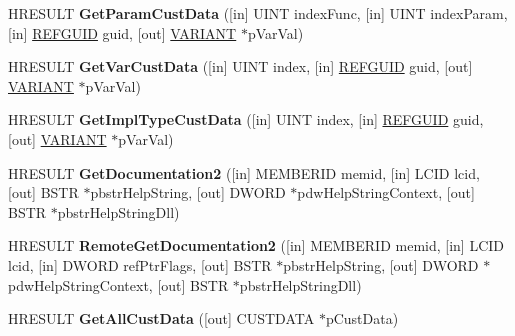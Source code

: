 \begin{DoxyCompactItemize}
H\+R\+E\+S\+U\+LT {\bfseries Get\+Param\+Cust\+Data} (\mbox{[}in\mbox{]} U\+I\+NT index\+Func, \mbox{[}in\mbox{]} U\+I\+NT index\+Param, \mbox{[}in\mbox{]} \hyperlink{struct___g_u_i_d}{R\+E\+F\+G\+U\+ID} guid, \mbox{[}out\mbox{]} \hyperlink{structtag_v_a_r_i_a_n_t}{V\+A\+R\+I\+A\+NT} $\ast$p\+Var\+Val)
\item 
\mbox{\label{interface_i_type_info2_a6b3f7e393c874684c1f5e0df42af2ac3}} 
H\+R\+E\+S\+U\+LT {\bfseries Get\+Var\+Cust\+Data} (\mbox{[}in\mbox{]} U\+I\+NT index, \mbox{[}in\mbox{]} \hyperlink{struct___g_u_i_d}{R\+E\+F\+G\+U\+ID} guid, \mbox{[}out\mbox{]} \hyperlink{structtag_v_a_r_i_a_n_t}{V\+A\+R\+I\+A\+NT} $\ast$p\+Var\+Val)
\item 
\mbox{\label{interface_i_type_info2_a78a790f9c5c1561b15cf69126e0146f1}} 
H\+R\+E\+S\+U\+LT {\bfseries Get\+Impl\+Type\+Cust\+Data} (\mbox{[}in\mbox{]} U\+I\+NT index, \mbox{[}in\mbox{]} \hyperlink{struct___g_u_i_d}{R\+E\+F\+G\+U\+ID} guid, \mbox{[}out\mbox{]} \hyperlink{structtag_v_a_r_i_a_n_t}{V\+A\+R\+I\+A\+NT} $\ast$p\+Var\+Val)
\item 
\mbox{\label{interface_i_type_info2_ad0cf0c41664f14c6afbe1b217b8a257f}} 
H\+R\+E\+S\+U\+LT {\bfseries Get\+Documentation2} (\mbox{[}in\mbox{]} M\+E\+M\+B\+E\+R\+ID memid, \mbox{[}in\mbox{]} L\+C\+ID lcid, \mbox{[}out\mbox{]} B\+S\+TR $\ast$pbstr\+Help\+String, \mbox{[}out\mbox{]} D\+W\+O\+RD $\ast$pdw\+Help\+String\+Context, \mbox{[}out\mbox{]} B\+S\+TR $\ast$pbstr\+Help\+String\+Dll)
\item 
\mbox{\label{interface_i_type_info2_aa3851272af1a35f222c25d2acca8805e}} 
H\+R\+E\+S\+U\+LT {\bfseries Remote\+Get\+Documentation2} (\mbox{[}in\mbox{]} M\+E\+M\+B\+E\+R\+ID memid, \mbox{[}in\mbox{]} L\+C\+ID lcid, \mbox{[}in\mbox{]} D\+W\+O\+RD ref\+Ptr\+Flags, \mbox{[}out\mbox{]} B\+S\+TR $\ast$pbstr\+Help\+String, \mbox{[}out\mbox{]} D\+W\+O\+RD $\ast$pdw\+Help\+String\+Context, \mbox{[}out\mbox{]} B\+S\+TR $\ast$pbstr\+Help\+String\+Dll)
\item 
\mbox{\label{interface_i_type_info2_affd2945c4671e5c808d1fc460b7670d1}} 
H\+R\+E\+S\+U\+LT {\bfseries Get\+All\+Cust\+Data} (\mbox{[}out\mbox{]} C\+U\+S\+T\+D\+A\+TA $\ast$p\+Cust\+Data)
\item 

\end{DoxyCompactItemize}
